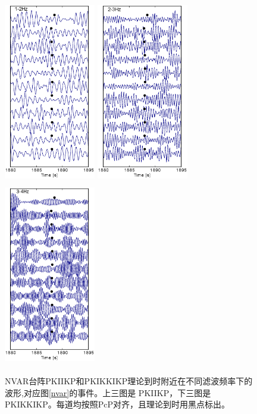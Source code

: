 \begin{figure}[!ht]
	\includegraphics[width=4cm,height=8cm]{fig/chap3/nvar_e2_1_2.eps}
	\includegraphics[width=4cm,height=8cm]{fig/chap3/nvar_e2_2_3.eps}
	\includegraphics[width=4cm,height=8cm]{fig/chap3/nvar_e2_3_4.eps}
	\caption{NVAR台阵PKIIKP和PKIKKIKP理论到时附近在不同滤波频率下的波形,对应图\ref{nvar}的事件。上三图是%
PKIIKP，下三图是PKIKKIKP。每道均按照PcP对齐，且理论到时用黑点标出。}
	\label{nvar_e1_e2}
\end{figure}

